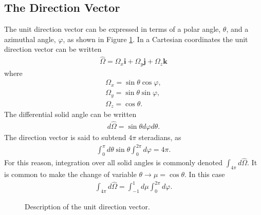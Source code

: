 \documentclass[11pt]{article}
\renewcommand\vec{\mathbf}
\begin{document}
\subsection{The Direction Vector}
\label{sec:orgheadline42}
The unit direction vector can be expressed in terms of a polar angle, \(\theta\), and a azimuthal angle, \(\varphi\), as shown in Figure \ref{fig::unitDirection}.  In a Cartesian coordinates the unit direction vector can be written
\begin{align}
  \hat{\Omega} = \Omega_x \vec{i} + \Omega_y \vec{j} + \Omega_z \vec{k}
\end{align} 
where
\begin{subequations}
\begin{align}
  \Omega_x = \sin\theta \cos\varphi, \\
  \Omega_y = \sin\theta \sin\varphi, \\
  \Omega_z = \cos\theta.
\end{align}
\end{subequations}
The differential solid angle can be written
\begin{align}
  d\hat{\Omega} = \sin\theta d\varphi d\theta.
\end{align}
The direction vector is said to subtend \(4\pi\) steradians, as
\begin{align}
  \int_0^\pi d\theta \sin\theta \int_0^{2\pi} d\varphi = 4\pi.
\end{align}
For this reason, integration over all solid angles is commonly denoted \(\int_{4\pi} d\hat{\Omega}\).
It is common to make the change of variable \(\theta \rightarrow \mu = \cos\theta\).  In this case
\begin{align}
  \int_{4\pi} d\hat{\Omega} = \int_{-1}^1 d\mu \int_0^{2\pi} d\varphi.
\end{align}

\begin{figure}
\centering
{}
\caption{Description of the unit direction vector.}
\label{fig::unitDirection}
\end{figure}
\end{document}
